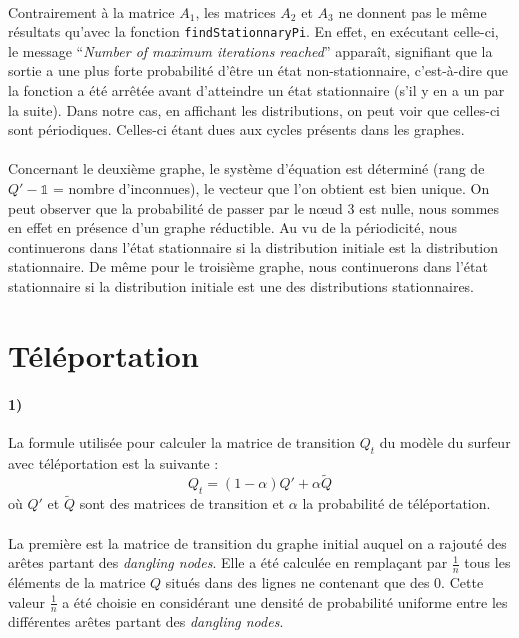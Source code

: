 \documentclass[a4paper,titlepage]{report}
\begin{document}
\paragraph{}
Contrairement à la matrice $A_1$, les matrices $A_2$ et $A_3$ ne donnent pas le même résultats qu'avec la fonction \texttt{findStationnaryPi}. En effet, en exécutant celle-ci, le message ``\textit{Number of maximum iterations reached}'' apparaît, signifiant que la sortie a une plus forte probabilité d'être un état non-stationnaire, c'est-à-dire que la fonction a été arrêtée avant d'atteindre un état stationnaire (s'il y en a un par la suite). Dans notre cas, en affichant les distributions, on peut voir que celles-ci sont périodiques. Celles-ci étant dues aux cycles présents dans les graphes.
\paragraph{}
Concernant le deuxième graphe, le système d'équation est déterminé (rang de $Q' - \mathbb{1}$ = nombre d'inconnues), le vecteur que l'on obtient est bien unique. On peut observer que la probabilité de passer par le nœud 3 est nulle, nous sommes en effet en présence d'un graphe réductible. Au vu de la périodicité, nous continuerons dans l'état stationnaire si la distribution initiale est la distribution stationnaire. De même pour le troisième graphe, nous continuerons dans l'état stationnaire si la distribution initiale est une des distributions stationnaires.

\section{Téléportation}
\paragraph{1)}
La formule utilisée pour calculer la matrice de transition $Q_t$ du modèle du surfeur avec téléportation est la suivante :
\[
	Q_t = (1 - \alpha) Q' + \alpha \tilde{Q}
\]
où $Q'$ et $\tilde{Q}$ sont des matrices de transition et $\alpha$ la probabilité de téléportation. 
\paragraph{}
La première est la matrice de transition du graphe initial auquel on a rajouté des arêtes partant des \textit{dangling nodes}. Elle a été calculée en remplaçant par $\frac{1}{n}$ tous les éléments de la matrice $Q$ situés dans des lignes ne contenant que des 0. Cette valeur $\frac{1}{n}$ a été choisie en considérant une densité de probabilité uniforme entre les différentes arêtes partant des \textit{dangling nodes}. 
\end{document}
